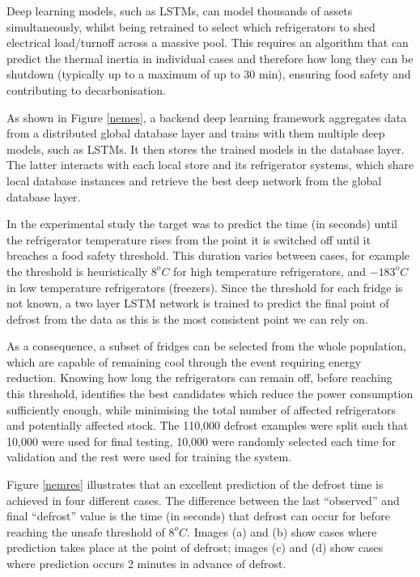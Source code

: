 \documentclass[journal,article,accept,moreauthors,pdftex]{Definitions/mdpi}
\begin{document}
Deep learning models, such as LSTMs, can model thousands of assets simultaneously, whilst being retrained to select which refrigerators to shed electrical load/turnoff across a massive pool. This requires an algorithm that can predict the thermal inertia in individual cases and therefore how long they can be shutdown (typically up to a maximum of up to 30 min), ensuring food safety and contributing to decarbonisation. 
 

As shown in Figure \ref{nemes}, a backend deep learning framework aggregates data from a distributed global database layer and trains with them multiple deep models, such as LSTMs. It then stores the trained models in the database layer. The latter interacts with each local store and its refrigerator systems, which share local database instances and retrieve the best deep network from the global database layer.

In the experimental study the target was to predict the time (in seconds) until the refrigerator temperature rises from the point it is switched off until it breaches a food safety threshold. This duration varies between cases, for example the threshold is heuristically $8^{o}C$ for high temperature refrigerators, and $-183^{o}C$ in low temperature refrigerators (freezers).  Since  the threshold for each fridge is not known, a two layer LSTM network is trained to predict the final point of defrost  from the data as this is the most consistent point we can rely on. 

As a consequence, a subset of fridges can be selected from the whole population, which are capable of remaining cool through the event requiring energy reduction. Knowing how long the refrigerators can remain off, before reaching this threshold, identifies the best candidates which reduce the power consumption sufficiently enough, while minimising the total number of affected refrigerators and potentially affected stock. The 110,000 defrost examples were split such that  10,000 were used for final testing, 10,000 were randomly selected each time for validation and the rest were used for training the system. 
 
 
Figure \ref{nemres} illustrates that an excellent prediction of the defrost time is achieved in four different cases.
The difference between the last “observed” and final “defrost” value is the time (in seconds) that defrost can occur for before reaching the unsafe threshold of $8^{o}C$. Images (a) and (b) show cases where prediction takes place at the point of defrost; images (c) and (d) show cases where prediction occurs 2 minutes in advance of defrost.
\end{document}
